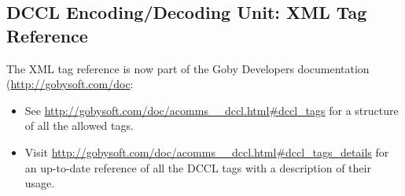 \documentclass[11pt, letterpaper, oneside]{memoir}
\begin{document}
\subsection{DCCL Encoding/Decoding Unit: XML Tag Reference}

The XML tag reference is now part of the Goby Developers documentation (\url{http://gobysoft.com/doc}:
\begin{itemize}
\item See \url{http://gobysoft.com/doc/acomms__dccl.html#dccl_tags} for a structure of all the allowed tags.
\item Visit \url{http://gobysoft.com/doc/acomms__dccl.html#dccl_tags_details} for an up-to-date reference of all the DCCL tags with a description of their usage.
\end{itemize}  
\end{document}
